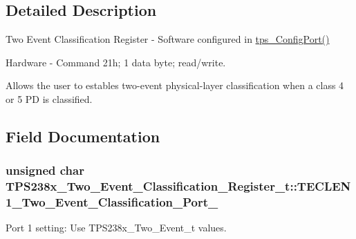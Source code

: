 \subsection{Detailed Description}
Two Event Classification Register -\/ Software configured in \hyperlink{_t_p_s23861_8c_a2b787818ef7e374af218c952d3ca8a08}{tps\-\_\-\-Config\-Port()} \par
 Hardware -\/ Command 21h; 1 data byte; read/write. \par
 \par
 Allows the user to estables two-\/event physical-\/layer classification when a class 4 or 5 P\-D is classified. 

\subsection{Field Documentation}
\hypertarget{struct_t_p_s238x___two___event___classification___register__t_a598efe8308a7a06573ecb8e43b5eed03}{
\subsubsection[{T\-E\-C\-L\-E\-N1\-\_\-\-Two\-\_\-\-Event\-\_\-\-Classification\-\_\-\-Port\-\_\-1}]{\setlength{\rightskip}{0pt plus 5cm}unsigned char T\-P\-S238x\-\_\-\-Two\-\_\-\-Event\-\_\-\-Classification\-\_\-\-Register\-\_\-t\-::\-T\-E\-C\-L\-E\-N1\-\_\-\-Two\-\_\-\-Event\-\_\-\-Classification\-\_\-\-Port\-\_}}\label{struct_t_p_s238x___two___event___classification___register__t_a598efe8308a7a06573ecb8e43b5eed03}


Port 1 setting\-: Use T\-P\-S238x\-\_\-\-Two\-\_\-\-Event\-\_\-t values. 

